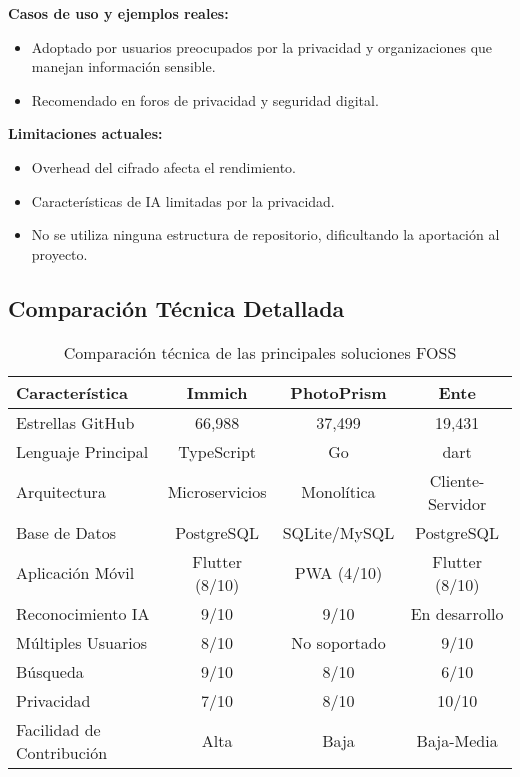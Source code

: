 \textbf{Casos de uso y ejemplos reales:}
\begin{itemize}
    \item Adoptado por usuarios preocupados por la privacidad y organizaciones que manejan información sensible.
    \item Recomendado en foros de privacidad y seguridad digital.
\end{itemize}

\textbf{Limitaciones actuales:}
\begin{itemize}
    \item Overhead del cifrado afecta el rendimiento.
    \item Características de IA limitadas por la privacidad.
    \item No se utiliza ninguna estructura de repositorio, dificultando la aportación al proyecto.
\end{itemize}

\subsection{Comparación Técnica Detallada}

\begin{table}[H]
\centering
\begin{tabular}{|l|c|c|c|}
\hline
\textbf{Característica} & \textbf{Immich} & \textbf{PhotoPrism} & \textbf{Ente} \\
\hline
Estrellas GitHub & 66,988 & 37,499 & 19,431 \\
Lenguaje Principal & TypeScript & Go & \gls{dart} \\
Arquitectura & Microservicios & Monolítica & Cliente-Servidor \\
Base de Datos & PostgreSQL & SQLite/MySQL & PostgreSQL \\
Aplicación Móvil & Flutter (8/10) & PWA (4/10) & Flutter (8/10) \\
Reconocimiento IA & 9/10 & 9/10 & En desarrollo \\
Múltiples Usuarios & 8/10 & No soportado & 9/10 \\
Búsqueda & 9/10 & 8/10 & 6/10 \\
Privacidad & 7/10 & 8/10 & 10/10 \\
Facilidad de Contribución & Alta & Baja & Baja-Media \\
\hline
\end{tabular}
\caption{Comparación técnica de las principales soluciones FOSS}
\label{tab:tech_comparison}
\end{table}

